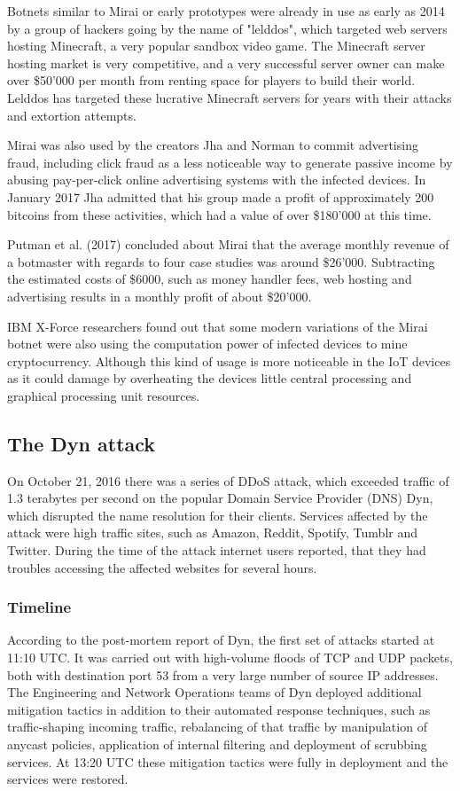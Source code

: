 Botnets similar to Mirai or early prototypes were already in use as early as 2014 by a group of hackers going by the name of "lelddos", which targeted web servers hosting Minecraft, a very popular sandbox video game.
The Minecraft server hosting market is very competitive, and a very successful server owner can make over \$50'000 per month from renting space for players to build their world.
Lelddos has targeted these lucrative Minecraft servers for years with their attacks and extortion attempts.\cite{Krebs17}

Mirai was also used by the creators Jha and Norman to commit advertising fraud, including click fraud as a less noticeable way to generate passive income by abusing pay-per-click online advertising systems with the infected devices.
In January 2017 Jha admitted that his group made a profit of approximately 200 bitcoins from these activities, which had a value of over \$180'000 at this time.\cite{Krebs17_2}

Putman et al. (2017) concluded about Mirai that the average monthly revenue of a botmaster with regards to four case studies was around \$26'000.
Subtracting the estimated costs of \$6000, such as money handler fees, web hosting and advertising results in a monthly profit of about \$20'000.\cite{Putman}

IBM X-Force researchers found out that some modern variations of the Mirai botnet were also using the computation power of infected devices to mine cryptocurrency.
Although this kind of usage is more noticeable in the IoT devices as it could damage by overheating the devices little central processing and graphical processing unit resources.\cite{DeBeck19}

\subsection{The Dyn attack}
On October 21, 2016 there was a series of DDoS attack, which exceeded traffic of 1.3 terabytes per second on the popular Domain Service Provider (DNS) Dyn, which disrupted the name resolution for their clients.
Services affected by the attack were high traffic sites, such as Amazon, Reddit, Spotify, Tumblr and Twitter.
During the time of the attack internet users reported, that they had troubles accessing the affected websites for several hours.\cite{Moss16}

\subsubsection{Timeline}
According to the post-mortem report of Dyn, the first set of attacks started at 11:10 UTC. It was carried out with high-volume floods of TCP and UDP packets, both with destination port 53 from a very large number of source IP addresses.
The Engineering and Network Operations teams of Dyn deployed additional mitigation tactics in addition to their automated response techniques, such as traffic-shaping incoming traffic, rebalancing of that traffic by manipulation of anycast policies, application of internal filtering and deployment of scrubbing services.
At 13:20 UTC these mitigation tactics were fully in deployment and the services were restored.\cite{Dyn16}

